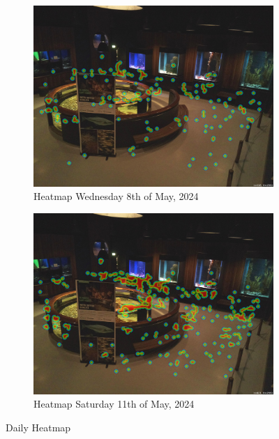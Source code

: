 \begin{figure}[H]
    \centering
    \begin{subfigure}{0.475\textwidth}
        \centering
        \includegraphics[width=\textwidth]{Images/Analytics/heatmap_day_08052024.jpg}
        \caption{Heatmap Wednesday 8th of May, 2024}
    \end{subfigure}
    \hfill
    \begin{subfigure}{0.475\textwidth}
        \centering
        \includegraphics[width=1\textwidth]{Images/Analytics/heatmap_day_11052024.jpg}
        \caption{Heatmap Saturday 11th of May, 2024}
    \end{subfigure}
    \caption{Daily Heatmap}
    \label{fig:heatmap_daily}
\end{figure}

